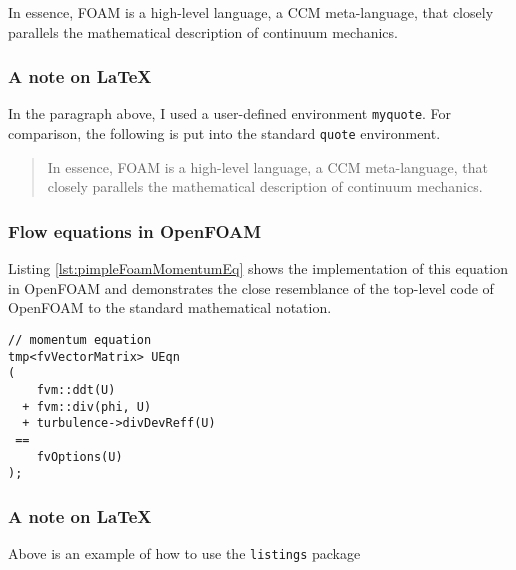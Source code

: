\begin{myquote}
In essence, \ac{FOAM} is a high-level language, a \acs{CCM} meta-language, that closely parallels 
the mathematical description of continuum mechanics.
\end{myquote}


\subsubsection*{A note on \LaTeX{}}

In the paragraph above, I used a user-defined environment \verb+myquote+. For comparison, 
the following is put into the standard \verb+quote+ environment.

\begin{quote}
In essence, \ac{FOAM} is a high-level language, a \acs{CCM} meta-language, that closely parallels 
the mathematical description of continuum mechanics.
\end{quote}





\subsubsection{Flow equations in OpenFOAM}

Listing \ref{lst:pimpleFoamMomentumEq} shows the implementation of this equation in OpenFOAM and demonstrates the 
close resemblance of the top-level code of OpenFOAM to the standard mathematical notation.

\begin{lstlisting}[escapechar=§,style=cppStyle,caption={The momentum equation of the transient incompressible 
	solver \emph{pimpleFoam}.},label=lst:pimpleFoamMomentumEq] 
// momentum equation
tmp<fvVectorMatrix> UEqn
(
    fvm::ddt(U)
  + fvm::div(phi, U)
  + turbulence->divDevReff(U)
 ==
    fvOptions(U)
);
\end{lstlisting}

\subsubsection*{A note on \LaTeX{}}

Above is an example of how to use the \verb+listings+ package





